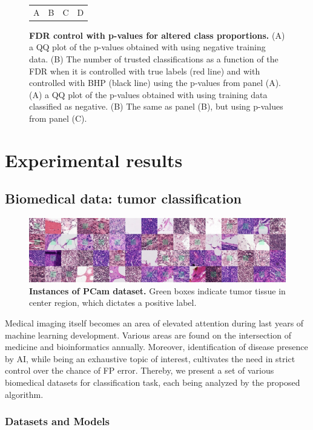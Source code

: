 \documentclass{article}
\begin{document}
\begin{figure}[hp]
\begin{tabular}{cccc}
		A & B & C & D \\
	\end{tabular}
	\caption{{\bf  FDR control with p-values for altered class proportions.}
		(A) a QQ plot of the p-values obtained with using negative training data. (B) The number of trusted classifications as a function of the FDR when it is controlled with true labels (red line) and with controlled with BHP (black line) using the p-values from panel (A).
		(A) a QQ plot of the p-values obtained with using training data classified as negative. (B) The same as panel (B), but using p-values from panel (C).
	}
	\label{fig:mnist_rebalance}
\end{figure}

\section{Experimental results}

\subsection{Biomedical data: tumor classification}

\begin{figure}
	\centering
	\includegraphics[width=6in]{img/pcam_example.png}
	\caption{{\bf Instances of PCam dataset.} Green boxes indicate tumor tissue in center region, which dictates a positive label.}
	\label{fig:pcam_example}
\end{figure} 

Medical imaging itself becomes an area of elevated attention during last years of machine learning development. Various areas are found on the intersection of medicine and bioinformatics annually. Moreover, identification of disease presence by AI, while being an exhaustive topic of interest, cultivates the need in strict control over the chance of FP error. Thereby, we present a set of various biomedical datasets for classification task, each being analyzed by the proposed algorithm.

\subsubsection{Datasets and Models}
\end{document}

